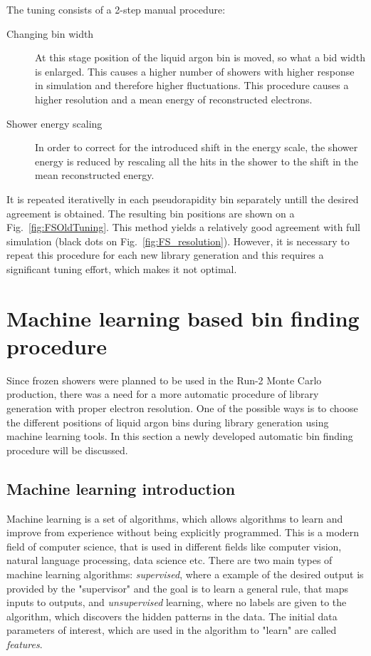 The tuning consists of a 2-step manual procedure:
\begin{description}
\item [Changing bin width] At this stage position of the liquid argon bin is moved, so what a bid width is enlarged. This causes a higher number of showers with higher response in simulation and therefore higher fluctuations. This procedure causes a higher resolution and a mean energy of reconstructed electrons.
\item [Shower energy scaling] In order to correct for the introduced shift in the energy scale, the shower energy is reduced by rescaling all the hits in the shower to the shift in the mean reconstructed energy.
\end{description}
 It is repeated iterativelly in each pseudorapidity bin separately untill the desired agreement is obtained. The resulting bin positions are shown on a Fig.~\ref{fig:FSOldTuning}. This method yields a relatively good agreement with full simulation (black dots on Fig.~\ref{fig:FS_resolution}). However, it is necessary to repeat this procedure for each new library generation and this requires a significant tuning effort, which makes it not optimal. 

\section{Machine learning based bin finding procedure}\label{sec:MLBinning}

Since frozen showers were planned to be used in the Run-2 Monte Carlo production, there was a need for a more automatic procedure of library generation with proper electron resolution. One of the possible ways is to choose the different positions of liquid argon bins during library generation using machine learning tools. In this section a newly developed automatic bin finding procedure will be discussed.

\subsection{Machine learning introduction} 

Machine learning is a set of algorithms, which allows algorithms to learn and improve from experience without being explicitly programmed. This is a modern field of computer science, that is used in different fields like computer vision, natural language processing, data science etc. There are two main types of machine learning algorithms: \textit{supervised}, where a example of the desired output is provided by the "supervisor" and the goal is to learn a general rule, that maps inputs to outputs, and \textit{unsupervised} learning, where no labels are given to the algorithm, which discovers the hidden patterns in the data\cite{0070428077}. The initial data parameters of interest, which are used in the algorithm to "learn" are called \textit{features}. 

